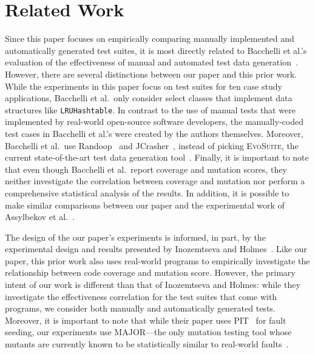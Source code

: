 
\section{Related Work} \label{sec:related_work}

Since this paper focuses on empirically comparing manually implemented and automatically generated test suites, it is most directly related to Bacchelli et al.'s evaluation of the effectiveness of manual and automated test data generation~\cite{bacchelli2008}. However, there are several distinctions between our paper and this prior work. While the experiments in this paper focus on test suites for ten case study applications, Bacchelli et al.\ only consider select classes that implement data structures like {\tt LRUHashtable}. In contrast to the use of manual tests that were implemented by real-world open-source software developers, the manually-coded test cases in Bacchelli et al.'s were created by the authors themselves.  Moreover, Bacchelli et al.\ use Randoop~\cite{pacheco2007feedback} and JCrasher~\cite{csallner2004}, instead of picking \textsc{EvoSuite}, the current state-of-the-art test data generation tool~\cite{fraser2013a}. Finally, it is important to note that even though Bacchelli et al.\ report coverage and mutation scores, they neither investigate the correlation between coverage and mutation nor perform a comprehensive statistical analysis of the results. In addition, it is possible to make similar comparisons between our paper and the experimental work of Assylbekov et al.~\cite{assylbekov2013}.

The design of the our paper's experiments is informed, in part, by the experimental design and results presented by Inozemtseva and Holmes~\cite{inozemtseva2014}. Like our paper, this prior work also uses real-world programs to empirically investigate the relationship between code coverage and mutation score. However, the primary intent of our work is different than that of Inozemtseva and Holmes: while they investigate the effectiveness correlation for the test suites that come with programs, we consider both manually and automatically generated tests. Moreover, it is important to note that while their paper uses PIT~\cite{pit2014} for fault seeding, our experiments use MAJOR---the only mutation testing tool whose mutants are currently known to be statistically similar to real-world faults~\cite{just2014}.

